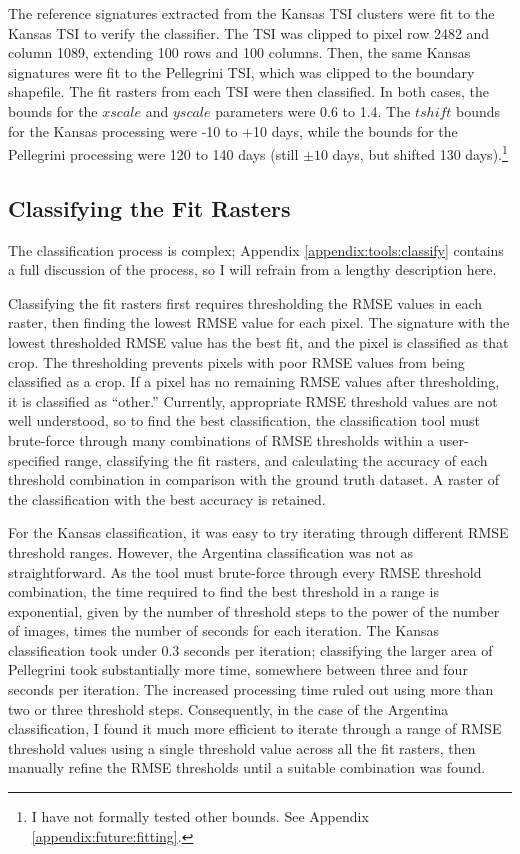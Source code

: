 The reference signatures extracted from the Kansas TSI clusters were fit to the Kansas TSI to verify the classifier. The TSI was clipped to pixel row 2482 and column 1089, extending 100 rows and 100 columns. Then, the same Kansas signatures were fit to the Pellegrini TSI, which was clipped to the boundary shapefile. The fit rasters from each TSI were then classified. In both cases, the bounds for the $xscale$ and $yscale$ parameters were 0.6 to 1.4. The $tshift$ bounds for the Kansas processing were -10 to +10 days, while the bounds for the Pellegrini processing were 120 to 140 days (still $\pm10$ days, but shifted 130 days).\footnote{I have not formally tested other bounds. See Appendix \ref{appendix:future:fitting}.}

\subsection{Classifying the Fit Rasters}

The classification process is complex; Appendix \ref{appendix:tools:classify} contains a full discussion of the process, so I will refrain from a lengthy description here.

Classifying the fit rasters first requires thresholding the RMSE values in each raster, then finding the lowest RMSE value for each pixel. The signature with the lowest thresholded RMSE value has the best fit, and the pixel is classified as that crop. The thresholding prevents pixels with poor RMSE values from being classified as a crop. If a pixel has no remaining RMSE values after thresholding, it is classified as ``other.'' Currently, appropriate RMSE threshold values are not well understood, so to find the best classification, the classification tool must brute-force through many combinations of RMSE thresholds within a user-specified range, classifying the fit rasters, and calculating the accuracy of each threshold combination in comparison with the ground truth dataset. A raster of the classification with the best accuracy is retained.

For the Kansas classification, it was easy to try iterating through different RMSE threshold ranges. However, the Argentina classification was not as straightforward. As the tool must brute-force through every RMSE threshold combination, the time required to find the best threshold in a range is exponential, given by the number of threshold steps to the power of the number of images, times the number of seconds for each iteration. The Kansas classification took under 0.3 seconds per iteration; classifying the larger area of Pellegrini took substantially more time, somewhere between three and four seconds per iteration. The increased processing time ruled out using more than two or three threshold steps. Consequently, in the case of the Argentina classification, I found it much more efficient to iterate through a range of RMSE threshold values using a single threshold value across all the fit rasters, then manually refine the RMSE thresholds until a suitable combination was found.